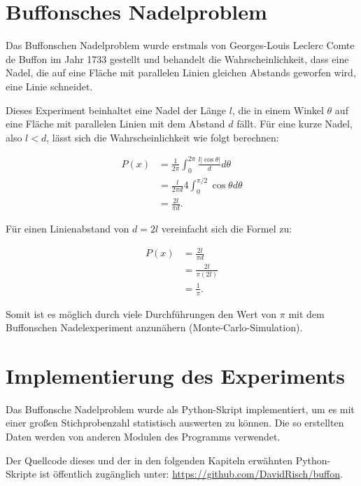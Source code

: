 \documentclass[10pt,twocolumn]{scrartcl}
\begin{document}
\section{Buffonsches Nadelproblem}
	\label{chap_buffon_needle}
	Das Buffonschen Nadelproblem wurde erstmals von Georges-Louis Leclerc Comte de Buffon im Jahr 1733 gestellt und behandelt die Wahrscheinlichkeit, dass eine Nadel, die auf eine Fläche mit parallelen Linien gleichen Abstands geworfen wird, eine Linie schneidet.
	
	Dieses Experiment beinhaltet eine Nadel der Länge $l$, die in einem Winkel $\theta$ auf eine Fläche mit parallelen Linien mit dem Abstand $d$ fällt. Für eine kurze Nadel, also $l < d$, lässt sich die Wahrscheinlichkeit wie folgt berechnen: \cite{MathWorld}

	\begin{align}
		P(x) &= \frac{1}{2\pi}\int_{0}^{2\pi}\frac{l|\cos{\theta}|}{d}d\theta \\ 
		&= \frac{l}{2 \pi d} 4 \int_{0}^{\pi/2}\cos{\theta}d\theta  \nonumber \\
		&= \frac{2l}{\pi d} \nonumber .
	\end{align}
	
	Für einen Linienabstand von $d=2l$ vereinfacht sich die Formel zu:
	
	\begin{align}
		P(x) &= \frac{2l}{\pi d} \nonumber \\ 
		&= \frac{2l}{\pi (2l)} \nonumber \\
		&= \frac{1}{\pi} .
	\end{align}
	
	Somit ist es möglich durch viele Durchführungen den Wert von $\pi$ mit dem Buffonschen Nadelexperiment anzunähern (Monte-Carlo-Simulation).

\section{Implementierung des Experiments}
	Das Buffonsche Nadelproblem wurde als Python-Skript implementiert, um es mit einer großen Stichprobenzahl statistisch auswerten zu können. Die so erstellten Daten werden von anderen Modulen des Programms verwendet.
	
	Der Quellcode dieses und der in den folgenden Kapiteln erwähnten Python-Skripte ist öffentlich zugänglich unter: \url{https://github.com/DavidRisch/buffon}.
\end{document}
